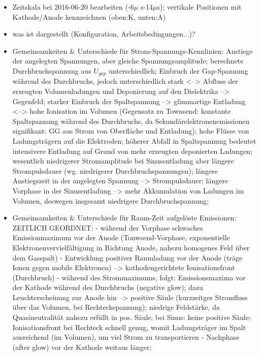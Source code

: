 \documentclass[a4paper,10pt]{article}
\begin{document}
			\begin{multicols}{2}
			
			\end{multicols}
				
		\twocolumn
		
		\begin{itemize}
			\item Zeitskala bei 2016-06-20 bearbeiten (-6$\mu$ s-14$\mu$s); vertikale Positionen mit Kathode/Anode kennzeichnen (oben:K, unten:A)
			\item was ist dargestellt (Konfiguration, Arbeitsbedingungen...)?
			\item Gemeinsamkeiten \& Unterschiede für Strom-Spannungs-Kennlinien: Anstiege der angelegten Spannungen, aber gleiche Spannungsamplitude; berechnete Durchbruchspannung aus $U_{gap}$ unterschiedlich; Einbruch der Gap-Spannung während des Durchbruchs, jedoch unterschiedlich stark <--> Abfluss der erzeugten Volumenladungen und Deponierung auf den Dielektrika --> Gegenfeld; starker Einbruch der Spaltspannung --> glimmartige Entladung <--> hohe Ionisation im Volumen (Gegensatz zu Townsend: konstante Spaltspannung während des Durchbruchs, da Sekundärelektronenemissionen signifikant: GG aus Strom von Oberfläche und Entladung); hohe Flüsse von Ladungsträgern auf die Elektroden; höherer Abfall in Spaltspannung bedeutet intensivere Entladung auf Grund von mehr erzeugten deponierten Ladungen; wesentlich niedrigerer Stromamplitude bei Sinusentladung aber längere Strompulsdauer (wg. niedrigerer Durchbruchspannungen); längere Anstiegszeit in der angelegten Spannung --> Strompulsdauer; längere Vorphase in der Sinusentladung --> mehr Akkumulation von Ladungen im Volumen, deswegen insgesamt niedrigere Durchbruchspannung; 
			\item Gemeinsamkeiten \& Unterschiede für Raum-Zeit aufgelöste Emissionen:
					ZEITLICH GEORDNET:	- während der Vorphase schwaches Emissionmaximum vor der Anode (Tonwsend-Vorphase, exponentielle Elektronenvervielfältigung in Richtung Anode, nahezu homogenes Feld über dem Gasspalt)
															- Entwicklung positiver Raumladung vor der Anode (träge Ionen gegen mobile Elektronen) --> kathodengerichtete Ionisationsfront (Durchbruch) 
															- während des Strommaximums, folgt: Emissionsmaxima vor der Kathode während des Durchbruchs (negative glow); dazu Leuchterscheinung zur Anode hin --> positive Säule (kurzzeitger Stromfluss über das Volumen, bei Rechteckspannung); niedrige Feldstärke, da Quasineutralität nahezu erfüllt in pos. Säule;  bei Sinus: keine positive Säule; Ionisationsfront bei Rechteck schnell genug, womit Ladungsträger im Spalt ausreichend (im Volumen), um viel Strom zu transportieren 
															- Nachphase (after glow) vor der Kathode weitaus länger;  
		\end{itemize}
		
\end{document}

